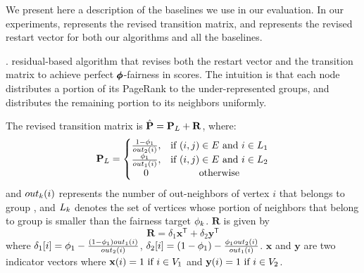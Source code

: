 We present here a description of the baselines we use in our evaluation.
In our experiments, 
\newtransmatrix represents the revised transition matrix, and 
\newrestartvec represents the revised restart vector for both our algorithms and all the baselines.



\smallskip
\noindent 
\lfpru\citep{tsioutsiouliklis_fairness-aware_2021}. 
\Amatrix residual-based algorithm that revises both the restart vector and the transition matrix to achieve perfect $\pmb{\phi}$-fairness in \pagerank scores. The intuition is that each node distributes a portion of its PageRank to the under-represented groups, and distributes the remaining portion to its neighbors uniformly. 

The revised transition matrix is $\hat{\mathbf{{P}}} = \mathbf{{P}}_L + \mathbf{R}$, where:
\begin{equation}
    \mathbf{{P}}_L =  
    \left\{\begin{matrix}
        \frac{1-\phi_1}{out_2(i)}, &  \text{if } (i,j)\in E \text{ and } i \in L_1\\
         \frac{\phi_1}{out_1(i)}, &  \text{if } (i,j)\in E \text{ and } i \in L_2\\
         0 & \text{otherwise} \\
    \end{matrix}\right.
    \end{equation}
and $out_{k}(i)$ represents the number of out-neighbors of vertex $i$ that belongs to group \agroup, and $L_k$ denotes the set of vertices whose portion of neighbors that belong to group \agroup is smaller than the fairness target $\phi_k$. $\mathbf{R}$ is given by
\begin{equation}
    \mathbf{R} = \delta_1 \mathbf{x}^{\mathsf{T}} + \delta_2 \mathbf{y}^{\mathsf{T}}
\end{equation}
where $\delta_1[i] = \phi_1 -\frac{(1-\phi_1)out_1(i)}{out_2(i)}$, $\delta_2[i] = (1-\phi_1) -\frac{\phi_1 out_2(i)}{out_1(i)}$. $\mathbf{x}$ and $\mathbf{y}$ are two indicator vectors where $\mathbf{x}(i) = 1 \text{ if }  i\in \group_1$ and $\mathbf{y}(i) = 1 \text{ if } i\in \group_2$.


